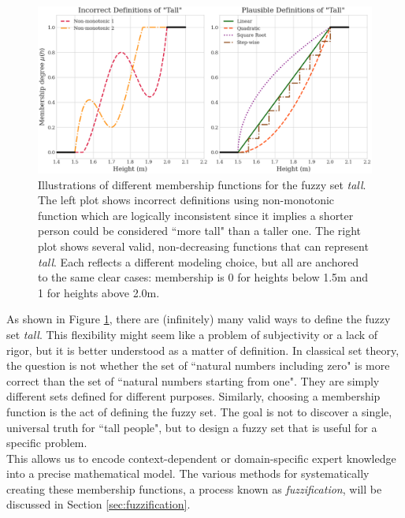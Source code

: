 \begin{figure}[!ht]
    \centering
    \includegraphics[width=\textwidth]{ch1/figures/Fuzzy_tall.png}
    \caption{Illustrations of different membership functions for the fuzzy set \emph{tall}. The left plot shows incorrect definitions using non-monotonic function which are logically inconsistent since it implies a shorter person could be considered ``more tall" than a taller one. The right plot shows several valid, non-decreasing functions that can represent \emph{tall}. Each reflects a different modeling choice, but all are anchored to the same clear cases: membership is 0 for heights below 1.5m and 1 for heights above 2.0m.}
    \label{fig:tall_definitions}
\end{figure}

As shown in Figure \ref{fig:tall_definitions}, there are (infinitely) many valid ways to define the fuzzy set \emph{tall}. This flexibility might seem like a problem of subjectivity or a lack of rigor, but it is better understood as a matter of definition. In classical set theory, the question is not whether the set of ``natural numbers including zero" is more correct than the set of ``natural numbers starting from one". They are simply different sets defined for different purposes. Similarly, choosing a membership function is the act of defining the fuzzy set. The goal is not to discover a single, universal truth for ``tall people", but to design a fuzzy set that is useful for a specific problem. \\

This allows us to encode context-dependent or domain-specific expert knowledge into a precise mathematical model. The various methods for systematically creating these membership functions, a process known as \textit{fuzzification}, will be discussed in Section \ref{sec:fuzzification}.\\

